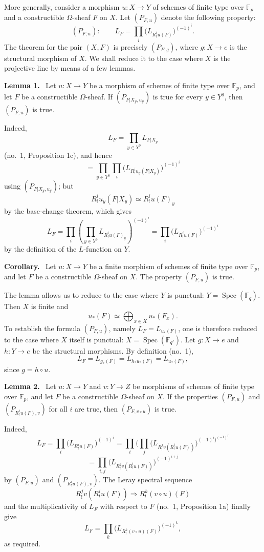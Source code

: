 \documentclass[11pt]{article}
\newenvironment{statement}[1]{\par\medskip\noindent\textbf{#1.}\ }{\par\medskip}
\DeclareMathOperator{\Spec}{Spec}
\providecommand{\Spec}{\operatorname{Spec}}
\providecommand{\Spec}{\operatorname{Spec}}
\providecommand{\Spec}{\operatorname{Spec}}
\providecommand{\Spec}{\operatorname{Spec}}
\begin{document}
More generally, consider a morphism $u:X\to Y$ of schemes of finite type over $\mathbb F_p$ and a constructible $\Omega$-sheaf $F$ on $X$. Let $(P_{F,u})$ denote the following property:
\[
(P_{F,u}):\qquad
L_F=\prod_i\bigl(L_{R^i_!u(F)}\bigr)^{(-1)^i}.
\]
The theorem for the pair $(X,F)$ is precisely $(P_{F,g})$, where $g:X\to e$ is the structural morphism of $X$. We shall reduce it to the case where $X$ is the projective line by means of a few lemmas.

\begin{statement}{Lemma 1}
Let $u:X\to Y$ be a morphism of schemes of finite type over $\mathbb F_p$, and let $F$ be a constructible $\Omega$-sheaf. If $(P_{F|X_y,u_y})$ is true for every $y\in Y^0$, then $(P_{F,u})$ is true.
\end{statement}

Indeed,
\[
L_F=\prod_{y\in Y^0}L_{F|X_y}
\]
(no.~1, Proposition 1c), and hence
\[
=\prod_{y\in Y^0}\prod_i\bigl(L_{R^i_!u_y(F|X_y)}\bigr)^{(-1)^i}
\]
using $(P_{F|X_y,u_y})$; but
\[
R^i_!u_y(F|X_y)\simeq R^i_!u(F)_y
\]
by the base-change theorem, which gives
\[
L_F=\prod_i\left(\prod_{y\in Y^0}L_{R^i_!u(F)_y}\right)^{(-1)^i}
=\prod_i\bigl(L_{R^i_!u(F)}\bigr)^{(-1)^i}
\]
by the definition of the $L$-function on $Y$.

\begin{statement}{Corollary}
Let $u:X\to Y$ be a finite morphism of schemes of finite type over $\mathbb F_p$, and let $F$ be a constructible $\Omega$-sheaf on $X$. The property $(P_{F,u})$ is true.
\end{statement}

The lemma allows us to reduce to the case where $Y$ is punctual: $Y=\Spec(\mathbb F_q)$. Then $X$ is finite and
\[
u_*(F)\simeq \bigoplus_{x\in X}u_*(F_x).
\]
To establish the formula $(P_{F,u})$, namely $L_F=L_{u_*(F)}$, one is therefore reduced to the case where $X$ itself is punctual: $X=\Spec(\mathbb F_{q'})$. Let $g:X\to e$ and $h:Y\to e$ be the structural morphisms. By definition (no.~1),
\[
L_F=L_{g_*(F)}=L_{h_*u_*(F)}=L_{u_*(F)},
\]
since $g=h\circ u$.

\begin{statement}{Lemma 2}
Let $u:X\to Y$ and $v:Y\to Z$ be morphisms of schemes of finite type over $\mathbb F_p$, and let $F$ be a constructible $\Omega$-sheaf on $X$. If the properties $(P_{F,u})$ and $(P_{R^i_!u(F),v})$ for all $i$ are true, then $(P_{F,v\circ u})$ is true.
\end{statement}

Indeed,
\[
L_F=\prod_i\bigl(L_{R^i_!u(F)}\bigr)^{(-1)^i}
 =\prod_i(\prod_j\bigl(L_{R^j_!v(R^i_!u(F))}\bigr)^{(-1)^i)^(-1)^j}
\]
\[
=\prod_{i,j}\bigl(L_{R^j_!v(R^i_!u(F))}\bigr)^{(-1)^{i+j}}
\]
by $(P_{F,u})$ and $(P_{R^i_!u(F),v})$. The Leray spectral sequence
\[
R^j_!v(R^i_!u(F))\Longrightarrow R^k_!(v\circ u)(F)
\]
and the multiplicativity of $L_F$ with respect to $F$ (no.~1, Proposition 1a) finally give
\[
L_F=\prod_k\bigl(L_{R^k_!(v\circ u)(F)}\bigr)^{(-1)^k},
\]
as required.
\end{document}
